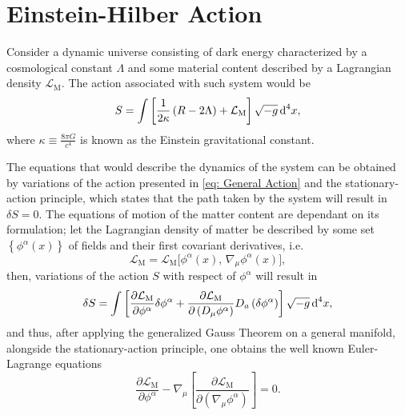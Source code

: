 \section{Einstein-Hilber Action}
Consider a dynamic universe consisting of dark energy characterized by a cosmological constant $\Lambda$ and some material content described by a Lagrangian density $\mathcal{L}_{\text{M}}$. The action associated with such system would be
\begin{equation}\label{eq: General Action}
	S=\int\left[\frac{1}{2\kappa}\left(R-2\Lambda\right)+\mathcal{L}_{\text{M}}\right]\sqrt{-g}\,\text{d}^4 x,
\end{equation}
where $\kappa\equiv\frac{8\pi G}{c^4}$ is known as the Einstein gravitational constant.

The equations that would describe the dynamics of the system can be obtained by variations of the action presented in \cref{eq: General Action} and the stationary-action principle, which states that the path taken by the system will result in $\delta S=0$. The equations of motion of the matter content are dependant on its formulation; let the Lagrangian density of matter be described by some set $\left\{\phi^\alpha(x)\right\}$ of fields and their first covariant derivatives, i.e.
\begin{equation}
	\mathcal{L}_{\text{M}}=\mathcal{L}_{\text{M}}\big[\phi^\alpha(x),\,\nabla_\mu\phi^\alpha(x)\big],
\end{equation}
then, variations of the action $S$ with respect of $\phi^\alpha$ will result in
\begin{equation}
	\delta S=\int\left[\frac{\partial \mathcal{L}_\text{M}}{\partial \phi^\alpha}\delta\phi^\alpha+\frac{\partial \mathcal{L}_\text{M}}{\partial\left(D_\mu\phi^\alpha\right)}D_a\left(\delta\phi^\alpha\right)\right]\sqrt{-g}\,\text{d}^4x,
\end{equation}
and thus, after applying the generalized Gauss Theorem on a general manifold, alongside the stationary-action principle, one obtains the well known Euler-Lagrange equations
\begin{equation}\label{eq: Euler-Lagrange}
	\frac{\partial\mathcal{L}_{\text{M}}}{\partial\phi^\alpha}-\nabla_\mu\left[\frac{\partial \mathcal{L}_{\text{M}}}{\partial\left(\nabla_\mu\phi^\alpha\right)}\right]=0.
\end{equation}

